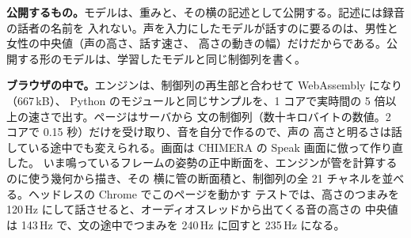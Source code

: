 \documentclass[10pt,a4paper,twocolumn]{article}
\begin{document}
\textbf{公開するもの。}モデルは、重みと、その横の記述として公開する。記述には録音の話者の名前を
入れない。声を入力にしたモデルが話すのに要るのは、男性と女性の中央値（声の高さ、話す速さ、
高さの動きの幅）だけだからである。公開する形のモデルは、学習したモデルと同じ制御列を書く。

\textbf{ブラウザの中で。}エンジンは、制御列の再生部と合わせて WebAssembly になり（667\,kB）、
Python のモジュールと同じサンプルを、1 コアで実時間の 5 倍以上の速さで出す。ページはサーバから
文の制御列（数十キロバイトの数値。2 コアで 0.15 秒）だけを受け取り、音を自分で作るので、声の
高さと明るさは話している途中でも変えられる。画面は CHIMERA の Speak 画面に倣って作り直した。
いま鳴っているフレームの姿勢の正中断面を、エンジンが管を計算するのに使う幾何から描き、その
横に管の断面積と、制御列の全 21 チャネルを並べる。ヘッドレスの Chrome でこのページを動かす
テストでは、高さのつまみを 120\,Hz にして話させると、オーディオスレッドから出てくる音の高さの
中央値は 143\,Hz で、文の途中でつまみを 240\,Hz に回すと 235\,Hz になる。
\end{document}
